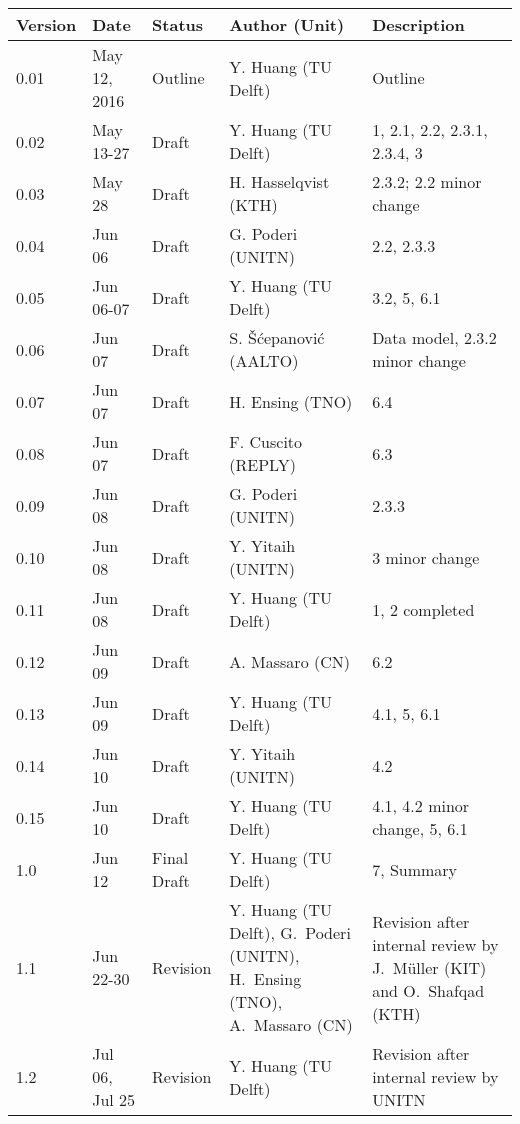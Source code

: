 {\small
\begin{tabularx}{\textwidth}{|l|l|l|>{\raggedright\arraybackslash}p{4cm}|X|}
\hline
\textbf{Version}	& \textbf{Date} &	\textbf{Status} &	\textbf{Author (Unit)} &	\textbf{Description}  \\ \hline
0.01 & May 12, 2016 & Outline & Y. Huang (TU Delft) & Outline\\ \hline
0.02 & May 13-27 & Draft & Y. Huang (TU Delft) & 1, 2.1, 2.2, 2.3.1, 2.3.4, 3\\ \hline
0.03 & May 28 & Draft & H. Hasselqvist (KTH) &  2.3.2; 2.2 minor change\\ \hline
0.04 & Jun 06 & Draft &  G. Poderi (UNITN) & 2.2, 2.3.3 \\ \hline
0.05 & Jun 06-07 & Draft & Y. Huang (TU Delft) & 3.2, 5, 6.1 \\ \hline
0.06 & Jun 07 & Draft &  S. \v{S}\'{c}epanovi\'{c} (AALTO) & Data model, 2.3.2 minor change \\ \hline
0.07 & Jun 07 & Draft &  H. Ensing (TNO) & 6.4 \\ \hline
0.08 & Jun 07 & Draft &  F. Cuscito (REPLY) & 6.3 \\ \hline
0.09 & Jun 08 & Draft &  G. Poderi (UNITN) & 2.3.3 \\ \hline
0.10 & Jun 08 & Draft &  Y. Yitaih (UNITN) & 3 minor change \\ \hline
0.11 & Jun 08 & Draft & Y. Huang (TU Delft) & 1, 2 completed \\ \hline
0.12 & Jun 09 & Draft & A. Massaro  (CN) & 6.2 \\ \hline
0.13 & Jun 09 & Draft & Y. Huang (TU Delft) & 4.1, 5, 6.1 \\ \hline
0.14 & Jun 10 & Draft & Y. Yitaih (UNITN) & 4.2 \\ \hline
0.15 & Jun 10 & Draft & Y. Huang (TU Delft) & 4.1, 4.2 minor change, 5, 6.1 \\ \hline
1.0 & Jun 12 & Final Draft & Y. Huang (TU Delft) & 7, Summary \\ \hline
1.1 & Jun 22-30 & Revision & Y. Huang (TU Delft), G.~Poderi (UNITN),  H.~Ensing (TNO), A.~Massaro  (CN)  & Revision after internal review by  J.~M\"uller (KIT) and O.~Shafqad (KTH) \\ \hline
1.2 & Jul 06, Jul 25 & Revision & Y. Huang (TU Delft) & Revision after internal review by UNITN \\ \hline
\end{tabularx}
}


